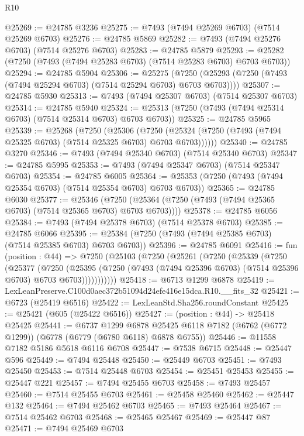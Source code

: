 \begin{lexlean}{R10}
\begin{coremodule}
@25269 := @24785 @3236
@25275 := @7493 (@7494 @25269 @6703) (@7514 @25269 @6703)
@25276 := @24785 @5869
@25282 := @7493 (@7494 @25276 @6703) (@7514 @25276 @6703)
@25283 := @24785 @5879
@25293 := @25282 (@7250 (@7493 (@7494 @25283 @6703) (@7514 @25283 @6703) @6703 @6703))
@25294 := @24785 @5904
@25306 := @25275
    (@7250 (@25293 (@7250 (@7493 (@7494 @25294 @6703) (@7514 @25294 @6703) @6703 @6703))))
@25307 := @24785 @5930
@25313 := @7493 (@7494 @25307 @6703) (@7514 @25307 @6703)
@25314 := @24785 @5940
@25324 := @25313 (@7250 (@7493 (@7494 @25314 @6703) (@7514 @25314 @6703) @6703 @6703))
@25325 := @24785 @5965
@25339 := @25268
    (@7250
      (@25306
        (@7250 (@25324 (@7250 (@7493 (@7494 @25325 @6703) (@7514 @25325 @6703) @6703 @6703))))))
@25340 := @24785 @3270
@25346 := @7493 (@7494 @25340 @6703) (@7514 @25340 @6703)
@25347 := @24785 @5995
@25353 := @7493 (@7494 @25347 @6703) (@7514 @25347 @6703)
@25354 := @24785 @6005
@25364 := @25353 (@7250 (@7493 (@7494 @25354 @6703) (@7514 @25354 @6703) @6703 @6703))
@25365 := @24785 @6030
@25377 := @25346
    (@7250 (@25364 (@7250 (@7493 (@7494 @25365 @6703) (@7514 @25365 @6703) @6703 @6703))))
@25378 := @24785 @6056
@25384 := @7493 (@7494 @25378 @6703) (@7514 @25378 @6703)
@25385 := @24785 @6066
@25395 := @25384 (@7250 (@7493 (@7494 @25385 @6703) (@7514 @25385 @6703) @6703 @6703))
@25396 := @24785 @6091
@25416 := fun (position : @44) =>
  @7250
    (@25103
      (@7250
        (@25261
          (@7250
            (@25339
              (@7250
                (@25377
                  (@7250
                    (@25395
                      (@7250 (@7493 (@7494 @25396 @6703) (@7514 @25396 @6703) @6703 @6703)))))))))))
@25418 := @6713 @1299 @6878
@25419 := LexLeanPreserve.C100d0aec372b51094d24efe416e15dca.R10.__fits_32
@25421 := @6723 (@25419 @6516)
@25422 := LexLeanStd.Sha256.roundConstant
@25425 := @25421 (@605 (@25422 @6516))
@25427 := (position : @44) -> @25418 @25425
@25441 := @6737
    @1299
    @6878
    @25425
    @6118
    @7182
    (@6762 (@6772 @1299))
    (@6778 (@6779 (@6780 @6118) @6878 @6755))
@25446 := @11558 @7182 @5186 @5618 @6116 @6708
@25447 := @7538 @6715
@25448 := @25447 @596
@25449 := @7494 @25448
@25450 := @25449 @6703
@25451 := @7493 @25450
@25453 := @7514 @25448 @6703
@25454 := @25451 @25453
@25455 := @25447 @221
@25457 := @7494 @25455 @6703
@25458 := @7493 @25457
@25460 := @7514 @25455 @6703
@25461 := @25458 @25460
@25462 := @25447 @132
@25464 := @7494 @25462 @6703
@25465 := @7493 @25464
@25467 := @7514 @25462 @6703
@25468 := @25465 @25467
@25469 := @25447 @87
@25471 := @7494 @25469 @6703

\end{coremodule}
\end{lexlean}
